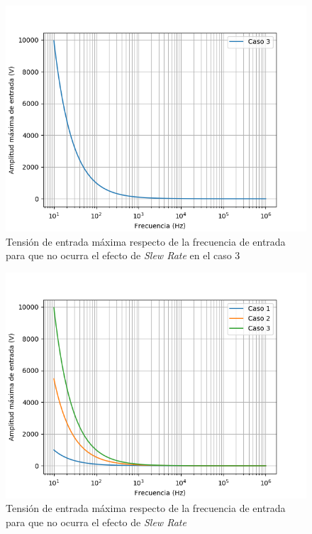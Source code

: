 \begin{figure}[H]
\begin{centering}
\includegraphics[scale=0.5]{../Ex1/iB/Resources1b/slewRate3}
\par\end{centering}
\centering{}\caption{Tensión de entrada máxima respecto de la frecuencia de entrada para
que no ocurra el efecto de \emph{Slew Rate} en el caso 3}
\label{1_b_25}
\end{figure}

\begin{figure}[H]
\begin{centering}
\includegraphics[scale=0.5]{../Ex1/iB/Resources1b/slewRate123}
\par\end{centering}
\centering{}\caption{Tensión de entrada máxima respecto de la frecuencia de entrada para
que no ocurra el efecto de \emph{Slew Rate}}
\label{1_b_26}
\end{figure}

